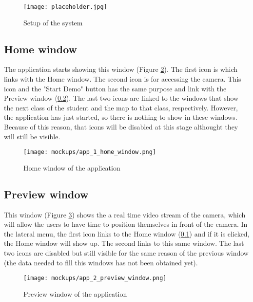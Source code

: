 \begin{figure}[!ht]
	\centering
	\texttt{[image: placeholder.jpg]}
	\caption{Setup of the system}
	\label{fig:system_setup}
\end{figure}	

	\subsection{Home window}
	\label{subsec:home_window}
	
	The application starts showing this window (Figure \ref{fig:home_window}). The first icon is which links with the Home window. The second icon is for accessing the camera. This icon and the "Start Demo" button has the same purpose and link with the Preview window (\ref{subsec:preview_window}). The last two icons are linked to the windows that show the next class of the student and the map to that class, respectively. However, the application has just started, so there is nothing to show in these windows. Because of this reason, that icons will be disabled at this stage althought they will still be visible.  

	\begin{figure}[!ht]
		\centering
		\texttt{[image: mockups/app\_1\_home\_window.png]}
		\caption{Home window of the application}
		\label{fig:home_window}
	\end{figure}

	\subsection{Preview window}
	\label{subsec:preview_window}

	This window (Figure \ref{fig:preview_window}) shows the a real time video stream of the camera, which will allow the users to have time to position themselves in front of the camera. In the lateral menu, the first icon links to the Home window (\ref{subsec:home_window}) and if it is clicked, the Home window will show up. The second links to this same window. The last two icons are disabled but still visible for the same reason of the previous window (the data needed to fill this windows has not been obtained yet).

	\begin{figure}[!ht]
		\centering
		\texttt{[image: mockups/app\_2\_preview\_window.png]}
		\caption{Preview window of the application}
		\label{fig:preview_window}
	\end{figure}

